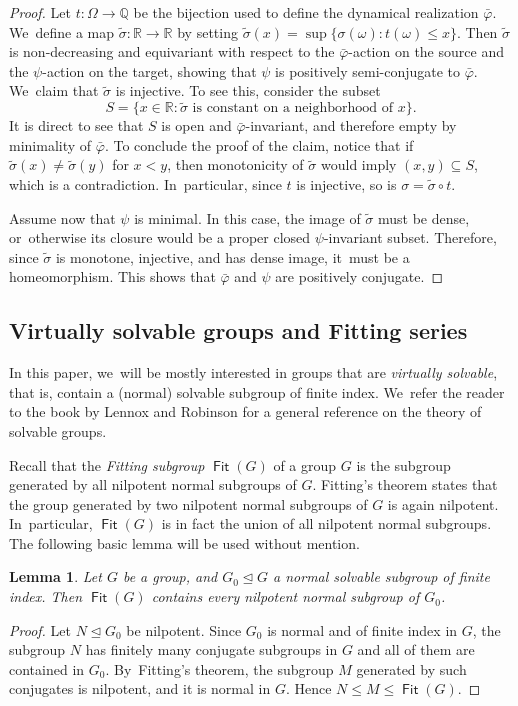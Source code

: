 \documentclass[JEP,XML,SOM,Unicode,NoFloatCountersInSection,published]{cedram}
\newtheorem{lem}[thm]{Lemma}
\theoremstyle{definition}
\DeclareMathOperator{\Fit}{\mathsf{Fit}}
\newcommand{\R}{\mathbb{R}}
\newcommand{\Q}{\mathbb Q}
\begin{document}
\begin{proof}
Let $t\colon \Omega\to \Q$ be the bijection used to define the dynamical realization $\bar\varphi$. We~define a map $\tilde{\sigma}\colon \R \to \R$ by setting $\tilde{\sigma}(x)=\sup \{\sigma(\omega) : t(\omega) \le x\}$. Then $\tilde{\sigma}$ is non-decreasing and equivariant with respect to the $\bar{\varphi}$-action on the source and the $\psi$-action on the target, showing that $\psi$ is positively semi-conjugate to $\bar{\varphi}$. We~claim that $\tilde{\sigma}$ is injective. To see this, consider the subset
\[S=\{x\in\R:\tilde\sigma\text{ is constant on a neighborhood of }x\}.
\]
It is direct to see that $S$ is open and $\bar\varphi$-invariant, and therefore empty by minimality of $\bar{\varphi}$. To conclude the proof of the claim, notice that if $\tilde{\sigma}(x)\neq\tilde\sigma(y)$ for $x<y$, then monotonicity of $\tilde\sigma$ would imply $(x,y)\subseteq S$, which is a contradiction. In~particular, since $t$ is injective, so is $\sigma=\tilde{\sigma}\circ t$.

Assume now that $\psi$ is minimal. In this case, the image of $\tilde\sigma$ must be dense, or~otherwise its closure would be a proper closed $\psi$-invariant subset. Therefore, since $\tilde{\sigma}$ is monotone, injective, and has dense image, it~must be a homeomorphism. This shows that $\bar{\varphi}$ and $\psi$ are positively conjugate.
\end{proof}

\subsection{Virtually solvable groups and Fitting series} \label{s-fitting}
In this paper, we~will be mostly interested in groups that are \emph{virtually solvable}, that is, contain a (normal) solvable subgroup of finite index. We~refer the reader to the book by Lennox and Robinson \cite{LDR} for a general reference on the theory of solvable groups.

Recall that the \emph{Fitting subgroup} $\Fit(G)$ of a group $G$ is the subgroup generated by all nilpotent normal subgroups of $G$. Fitting's theorem states that the group generated by two nilpotent normal subgroups of $G$ is again nilpotent. In~particular, $\Fit(G)$ is in fact the union of all nilpotent normal subgroups. The following basic lemma will be used without mention.
\begin{lem} \label{l-Fitting}
Let $G$ be a group, and $G_0\unlhd G$ a normal solvable subgroup of finite index. Then $\Fit(G)$ contains every nilpotent normal subgroup of $G_0$.
\end{lem}
\begin{proof}
Let $N\unlhd G_0$ be nilpotent. Since $G_0$ is normal and of finite index in $G$, the subgroup $N$ has finitely many conjugate subgroups in $G$ and all of them are contained in $G_0$. By~Fitting's theorem, the subgroup $M$ generated by such conjugates is nilpotent, and it is normal in $G$. Hence $N\le M\le \Fit(G)$.
\end{proof}
\end{document}
